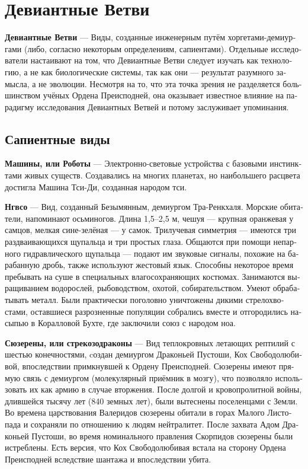 \documentclass[a4paper,12pt,fleqn]{book}\usepackage{polyglossia}\setdefaultlanguage[babelshorthands=true]{russian}\setotherlanguage{english}\defaultfontfeatures{Ligatures=TeX,Mapping=tex-text}\usepackage{xcolor}\newcommand{\ml}[3]{#2}
\newcommand{\theterm}[3]{\textbf{\hypertarget{#1}{#2}} --- #3}
\begin{document}
\section{Девиантные Ветви}

\theterm{deviant-forks}
{Девиантные Ветви}
{Виды, созданные инженерным путём хоргетами-демиургами (либо, согласно некоторым определениям, сапиентами).
Отдельные исследователи настаивают на том, что Девиантные Ветви следует изучать как технологию, а не как биологические системы, так как они --- результат разумного замысла, а не эволюции.
Несмотря на то, что эта точка зрения не разделяется большинством учёных Ордена Преисподней, она оказывает известное влияние на парадигму исследования Девиантных Ветвей и потому заслуживает упоминания.}

\subsection{Сапиентные виды}

\theterm{machinae}
{Машины, или Роботы}
{Электронно-световые устройства с базовыми инстинктами живых существ.
Создавались на многих планетах, но наибольшего расцвета достигла Машина Тси-Ди, созданная народом тси.}

\theterm{ngvso}
{Нгвсо}
{Вид, созданный Безымянным, демиургом Тра-Ренкхаля.
Морские обитатели, напоминают осьминогов.
Длина 1,5--2,5 м, чешуя --- крупная оранжевая у самцов, мелкая сине-зелёная --- у самок.
Трилучевая симметрия --- имеются три раздваивающихся щупальца и три простых глаза.
Общаются при помощи непарного гидравлического щупальца --- подают им звуковые сигналы, похожие на барабанную дробь, также используют жестовый язык.
Способны некоторое время пребывать на суше в специальных влагосохраняющих костюмах.
Занимаются выращиванием водорослей, рыбоводством, охотой, собирательством.
Умеют обрабатывать металл.
Были практически поголовно уничтожены дикими стрелохвостами, оставшиеся разрозненные популяции собрались вместе и отгородились насыпью в Коралловой Бухте, где заключили союз с народом ноа.}

\theterm{souzerena}
{Сюзерены, или стрекозодраконы}
{Вид теплокровных летающих рептилий с шестью конечностями, cоздан демиургом Драконьей Пустоши, Кох Свободолюбивой, впоследствии примкнувшей к Ордену Преисподней.
Сюзерены имеют прямую связь с демиургом (молекулярный приёмник в мозгу), что позволяло использовать их как армию в случае вторжения.
После долгой и кровопролитной войны, длившейся тысячу лет (840 земных лет), были вытеснены поселенцами с Земли.
Во времена царствования Валеридов сюзерены обитали в горах Малого Листопада и сохраняли по отношению к людям нейтралитет.
После захвата Адом Драконьей Пустоши, во время номинального правления Скорпидов сюзерены были истреблены.
Есть версия, что Кох Свободолюбивая встала на сторону Ордена Преисподней вследствие шантажа и впоследствии убита.}
\end{document}
